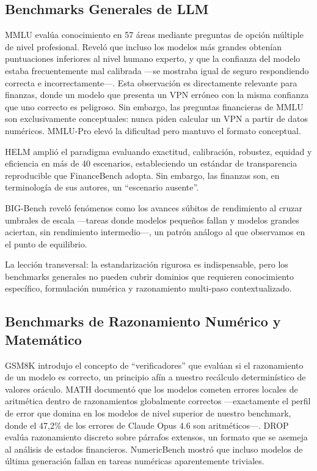 \documentclass[12pt,a4paper]{article}
\begin{document}
\subsection{Benchmarks Generales de LLM}

MMLU \citep{Hendrycks2021} evalúa conocimiento en 57 áreas mediante preguntas de opción múltiple de nivel profesional. Reveló que incluso los modelos más grandes obtenían puntuaciones inferiores al nivel humano experto, y que la confianza del modelo estaba frecuentemente mal calibrada ---se mostraba igual de seguro respondiendo correcta e incorrectamente---. Esta observación es directamente relevante para finanzas, donde un modelo que presenta un VPN erróneo con la misma confianza que uno correcto es peligroso. Sin embargo, las preguntas financieras de MMLU son exclusivamente conceptuales: nunca piden calcular un VPN a partir de datos numéricos. MMLU-Pro \citep{Yuan2024} elevó la dificultad pero mantuvo el formato conceptual.

HELM \citep{Liang2023} amplió el paradigma evaluando exactitud, calibración, robustez, equidad y eficiencia en más de 40 escenarios, estableciendo un estándar de transparencia reproducible que FinanceBench adopta. Sin embargo, las finanzas son, en terminología de sus autores, un ``escenario ausente''.

BIG-Bench \citep{Srivastava2022} reveló fenómenos como los avances súbitos de rendimiento al cruzar umbrales de escala ---tareas donde modelos pequeños fallan y modelos grandes aciertan, sin rendimiento intermedio---, un patrón análogo al que observamos en el punto de equilibrio.

La lección transversal: la estandarización rigurosa es indispensable, pero los benchmarks generales no pueden cubrir dominios que requieren conocimiento específico, formulación numérica y razonamiento multi-paso contextualizado.

\subsection{Benchmarks de Razonamiento Numérico y Matemático}

GSM8K \citep{Cobbe2021} introdujo el concepto de ``verificadores'' que evalúan si el razonamiento de un modelo es correcto, un principio afín a nuestro recálculo determinístico de valores oráculo. MATH \citep{Hendrycks2021b} documentó que los modelos cometen errores locales de aritmética dentro de razonamientos globalmente correctos ---exactamente el perfil de error que domina en los modelos de nivel superior de nuestro benchmark, donde el 47,2\% de los errores de Claude Opus 4.6 son aritméticos---. DROP \citep{Dua2019} evalúa razonamiento discreto sobre párrafos extensos, un formato que se asemeja al análisis de estados financieros. NumericBench \citep{Li2024} mostró que incluso modelos de última generación fallan en tareas numéricas aparentemente triviales.
\end{document}
